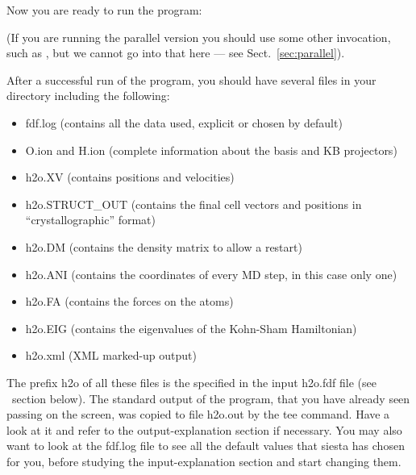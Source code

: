 \noindent
Now you are ready to run the program:


\noindent
(If you are running the parallel version you should use some other
invocation, such as , but we cannot
go into that here --- see Sect.~\ref{sec:parallel}).

After a successful run of the program, you should have several
files in your directory including the following:
\begin{itemize}

\item fdf.log
 (contains all the data used, explicit or chosen by default)
\item O.ion and H.ion
 (complete information about the basis and KB projectors)
\item h2o.XV
 (contains positions and velocities)
\item h2o.STRUCT\_OUT
 (contains the final cell vectors and positions in
 ``crystallographic'' format)
\item h2o.DM
 (contains the density matrix to allow a restart)
\item h2o.ANI
 (contains the coordinates of every MD step, in this case only one)
\item h2o.FA
 (contains the forces on the atoms)
\item h2o.EIG
 (contains the eigenvalues of the Kohn-Sham Hamiltonian)
\item h2o.xml
 (XML marked-up output)
\end{itemize}

The prefix h2o of all these files is the 
specified in the input h2o.fdf file (see \fdflib\ section below).
The standard output of the program, that you
have already seen passing on the screen, was copied to
file h2o.out by the tee command. Have a look at it
and refer to the output-explanation section if necessary.
You may also want to look at the fdf.log file to see all
the default values that siesta has chosen for you, before
studying the input-explanation section and start changing them.


